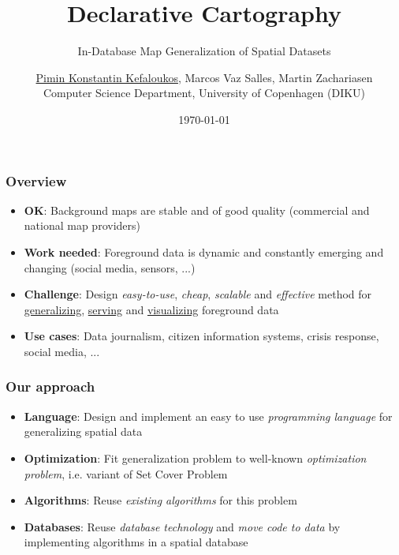 \documentclass{beamer}
\title{Declarative Cartography}
\subtitle{In-Database Map Generalization of Spatial Datasets}
\author{\underline{Pimin Konstantin Kefaloukos}, Marcos Vaz Salles, Martin Zachariasen\\ \small{Computer Science Department, University of Copenhagen} (DIKU)}
\date{\today}
\begin{document}
\frame{\titlepage}

\frame
{
  \frametitle{Overview}
  \begin{center}
  \end{center}
  
  \begin{itemize}
  \item \textbf{OK}: Background maps are stable and of good quality (commercial and national map providers)
  \item \textbf{Work needed}: Foreground data is dynamic and constantly emerging and changing (social media, sensors, ...)
  \item \textbf{Challenge}: Design \emph{easy-to-use}, \emph{cheap}, \emph{scalable} and \emph{effective} method for \underline{generalizing}, \underline{serving} and \underline{visualizing} foreground data
  \item \textbf{Use cases}: Data journalism, citizen information systems, crisis response, social media, ...
  \end{itemize}

}

\frame
{
  \frametitle{Our approach}
  \begin{itemize}
  \item \textbf{Language}: Design and implement an easy to use \emph{programming language} for generalizing spatial data 
  \item \textbf{Optimization}: Fit generalization problem to well-known \emph{optimization problem}, i.e. variant of Set Cover Problem~\cite{vazirani}
  \item \textbf{Algorithms}: Reuse \emph{existing algorithms} for this problem
  \item \textbf{Databases}: Reuse \emph{database technology} and \emph{move code to data} by implementing algorithms in a spatial database
  \end{itemize}
  \begin{center}
  \end{center}
}
\end{document}
